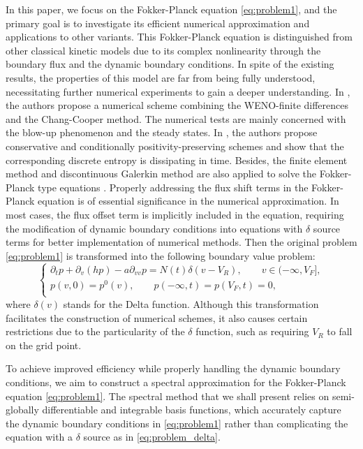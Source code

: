 In this paper, we focus on the Fokker-Planck equation \eqref{eq:problem1}, and the primary goal is to investigate its efficient numerical approximation and applications to other variants. This Fokker-Planck equation is distinguished from other classical kinetic models due to its complex nonlinearity through the boundary flux and the dynamic boundary conditions. In spite of the existing results, the properties of this model are far from being fully understood, necessitating further numerical experiments to gain a deeper understanding. In \cite{caceres2011numerical}, the authors propose a numerical scheme combining the WENO-finite differences and the Chang-Cooper method. The numerical tests are mainly concerned with the blow-up phenomenon and the steady states. In \cite{hu2021structure}\cite{he2022structure}, the authors propose conservative and conditionally positivity-preserving schemes and show that the corresponding discrete entropy is dissipating in time. Besides, the finite element method and discontinuous Galerkin method are also applied to solve the Fokker-Planck type equations \cite{sharma2019numerical}\cite{sharma2020discontinuous}. Properly addressing the flux shift terms in the Fokker-Planck equation is of essential significance in the numerical approximation. In most cases, the flux offset term is implicitly included in the equation, requiring the modification of dynamic boundary conditions into equations with $\delta$ source terms for better implementation of numerical methods. Then the original problem \eqref{eq:problem1} is transformed into the following boundary value problem:
\begin{equation}
\label{eq:problem_delta}
    \begin{cases}
        \partial_{t}p+\partial_{v}(hp)-a\partial_{v v}p=N(t)\delta(v-V_R),\qquad v\in(-\infty,V_F],\\
        p(v,0)=p^0(v),\qquad p(-\infty,t)=p(V_F,t)=0,\\
    \end{cases}
\end{equation}
where $\delta(v)$ stands for the Delta function. Although  this transformation facilitates the construction of numerical schemes, it also causes certain restrictions due to the particularity of the $\delta$ function, such as requiring $V_R$ to fall on the grid point.


To achieve improved efficiency while properly handling the dynamic boundary conditions, we aim to construct a spectral approximation for the Fokker-Planck equation \eqref{eq:problem1}. The spectral method that we shall present relies on semi-globally differentiable and integrable basis functions, which accurately capture the dynamic boundary conditions in \eqref{eq:problem1} rather than complicating the equation with a $\delta$ source as in \eqref{eq:problem_delta}. 

